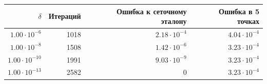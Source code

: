 \small
\begin{tabular}{rrrr}
\toprule
$\delta$ & Итераций & Ошибка к сеточному эталону & Ошибка в 5 точках\\
\midrule
$1.00\cdot10^{-6}$ & 1018 & $2.18\cdot10^{-4}$ & $4.04\cdot10^{-4}$\\
$1.00\cdot10^{-8}$ & 1508 & $1.42\cdot10^{-6}$ & $3.23\cdot10^{-4}$\\
$1.00\cdot10^{-10}$ & 1991 & $9.03\cdot10^{-9}$ & $3.23\cdot10^{-4}$\\
$1.00\cdot10^{-13}$ & 2582 & $0$ & $3.23\cdot10^{-4}$\\
\bottomrule
\end{tabular}
